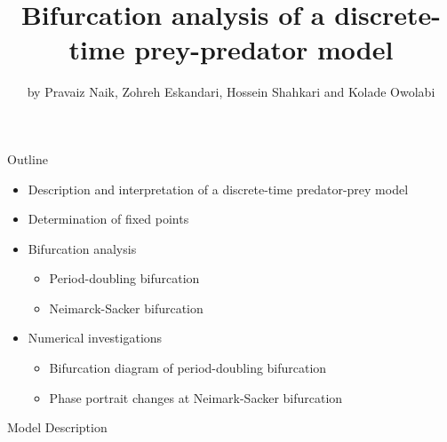 \documentclass[]{beamer}
\title{Bifurcation analysis of a discrete-time prey-predator model}
\author{by Pravaiz Naik, Zohreh Eskandari, Hossein Shahkari and Kolade Owolabi}
\institute{Presented by Jacob Hauck}
\date{}
\begin{document}
	\frame{\titlepage}
	
	\begin{frame}{Outline}
		\begin{itemize}
			\item Description and interpretation of a discrete-time predator-prey model
			\vfill
			
			\item Determination of fixed points
			\vfill
			
			\item Bifurcation analysis
			\begin{itemize}
				\item Period-doubling bifurcation
				\item Neimarck-Sacker bifurcation
			\end{itemize}
			\vfill
			
			\item Numerical investigations
			\begin{itemize}
				\item Bifurcation diagram of period-doubling bifurcation
				\item Phase portrait changes at Neimark-Sacker bifurcation
			\end{itemize}
		\end{itemize}
	\end{frame}
	
	\begin{frame}{Model Description}
		
	\end{frame}
\end{document}
